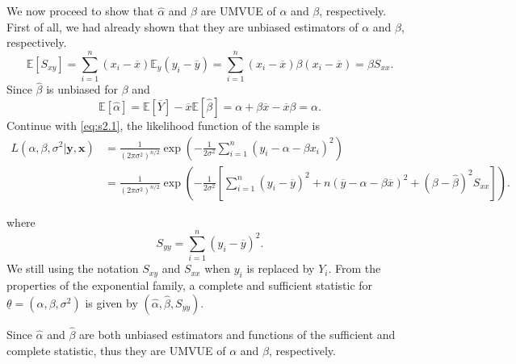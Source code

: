 \begin{example}
We now proceed to show that $\widehat{\alpha}$ and $\widehat{\beta}$ are UMVUE of $\alpha$ and $\beta$, respectively. First of all, 
we had already shown that they are unbiased estimators of $\alpha$ and $\beta$, respectively.
\[
    \mathbb{E}[S_{xy}] = \sum^n_{i=1} (x_i - \overline{x}) \mathbb{E}_y(y_i - \overline{y}) = \sum^n_{i=1} (x_i - \overline{x}) \beta (x_i - \overline{x}) =  \beta S_{xx}.
\]
Since $\widehat{\beta}$ is unbiased for $\beta$ and 
\[
    \mathbb{E}[\widehat{\alpha}] = \mathbb{E}[\overline{Y}] - \overline{x} \mathbb{E}[\widehat{\beta}] = \alpha + \beta \overline{x} - \overline{x} \beta = \alpha.
\]
Continue with \eqref{eq:s2.1}, the likelihood function of the sample is
\begin{align*}
    L(\alpha, \beta, \sigma^2 | \mathbf{y}, \mathbf{x}) &= \frac{1}{(2\pi\sigma^2)^{n/2}} \exp\left(-\frac{1}{2\sigma^2} \sum_{i=1}^n (y_i - \alpha - \beta x_i)^2\right)\\
    &= \frac{1}{(2\pi\sigma^2)^{n/2}} \exp\left(-\frac{1}{2\sigma^2} \left[ \sum_{i=1}^n (y_i - \overline{y})^2 + n(\overline{y} - \alpha - \beta \overline{x})^2 + (\beta - \widehat{\beta})^2 S_{xx} \right] \right).
\end{align*}

where 
\[
    S_{yy} = \sum_{i=1}^n (y_i - \overline{y})^2.
\]
We still using the notation $S_{xy}$ and $S_{xx}$ when $y_i$ is replaced by $Y_i$. From the properties of the exponential family, a complete and sufficient
statistic for $\underline{\theta} = (\alpha, \beta, \sigma^2)$ is given by $(\widehat{\alpha}, \widehat{\beta}, S_{yy})$.

Since $\widehat{\alpha}$ and $\widehat{\beta}$ are both unbiased estimators and functions of the sufficient and complete 
statistic, thus they are UMVUE of $\alpha$ and $\beta$, respectively.

\end{example}
